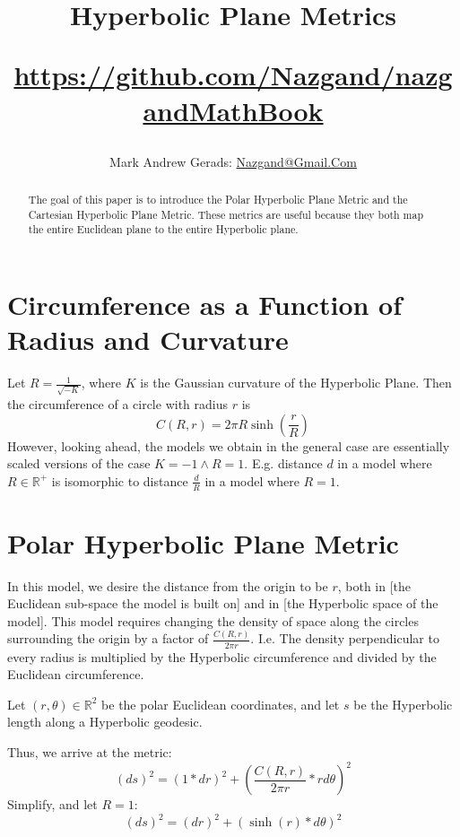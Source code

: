 \documentclass[]{article}
\author{Mark Andrew Gerads: \href{MailTo:Nazgand@Gmail.Com}{Nazgand@Gmail.Com}}
\title{
	Hyperbolic Plane Metrics
	
	\href{https://github.com/Nazgand/nazgandMathBook}{https://github.com/Nazgand/nazgandMathBook}
}
\newcommand{\pqty}[1]{{\left(#1\right)}}
\numberwithin{equation}{section}
\begin{document}
	
	\maketitle
	
	\begin{abstract}
		The goal of this paper is to introduce the Polar Hyperbolic Plane Metric and the Cartesian Hyperbolic Plane Metric. These metrics are useful because they both map the entire Euclidean plane to the entire Hyperbolic plane.
	\end{abstract}
	
	\section{Circumference as a Function of Radius and Curvature}
	Let $R=\frac{1}{\sqrt{-K}}$, where $K$ is the Gaussian curvature of the Hyperbolic Plane. Then the circumference of a circle with radius $r$ is
	\begin{equation}
	C\pqty{R,r}=2\pi R\sinh\pqty{\frac{r}{R}}
	\end{equation}
	However, looking ahead, the models we obtain in the general case are essentially scaled versions of the case $K=-1\land R=1$. E.g. distance $d$ in a model where $R\in\mathbb{R}^+$ is isomorphic to distance $\frac{d}{R}$ in a model where $R=1$.
	
	\section{Polar Hyperbolic Plane Metric}
	In this model, we desire the distance from the origin to be $r$, both in [the Euclidean sub-space the model is built on] and in [the Hyperbolic space of the model]. This model requires changing the density of space along the circles surrounding the origin by a factor of $\frac{C\pqty{R,r}}{2\pi r}$. I.e. The density perpendicular to every radius is multiplied by the Hyperbolic circumference and divided by the Euclidean circumference. 
	
	Let $(r,\theta)\in\mathbb{R}^2$ be the polar Euclidean coordinates, and let $s$ be the Hyperbolic length along a Hyperbolic geodesic.
	
	Thus, we arrive at the metric:
	\begin{equation}
	\pqty{ds}^2 = \pqty{1*dr}^2 + \pqty{\frac{C\pqty{R,r}}{2\pi r}*r d\theta}^2
	\end{equation}
	Simplify, and let $R=1$:
	\begin{equation}
	\pqty{ds}^2 = \pqty{dr}^2 + \pqty{\sinh\pqty{r}*d\theta}^2
	\end{equation}
	
\end{document}
